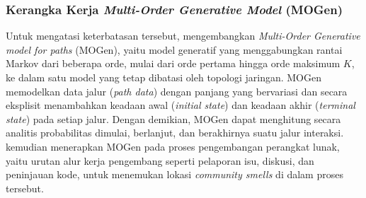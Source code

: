

\subsubsection{Kerangka Kerja \textit{Multi-Order Generative Model} (MOGen)}
Untuk mengatasi keterbatasan tersebut, \textcite{gote2023mogen} mengembangkan \textit{Multi-Order Generative model for paths} (MOGen), yaitu model generatif yang menggabungkan rantai Markov dari beberapa orde, mulai dari orde pertama hingga orde maksimum $K$, ke dalam satu model yang tetap dibatasi oleh topologi jaringan.
MOGen memodelkan data jalur (\textit{path data}) dengan panjang yang bervariasi dan secara eksplisit menambahkan keadaan awal (\textit{initial state}) dan keadaan akhir (\textit{terminal state}) pada setiap jalur.
Dengan demikian, MOGen dapat menghitung secara analitis probabilitas dimulai, berlanjut, dan berakhirnya suatu jalur interaksi.
\textcite{gote2023locating} kemudian menerapkan MOGen pada proses pengembangan perangkat lunak, yaitu urutan alur kerja pengembang seperti pelaporan isu, diskusi, dan peninjauan kode, untuk menemukan lokasi \textit{community smells} di dalam proses tersebut.

